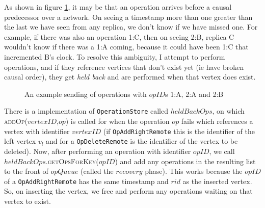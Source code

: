 \documentclass[diss.tex]{subfiles}
\begin{document}
As shown in figure \ref{fig:deliveryorder}, it may be that an operation arrives before a causal predecessor over a network. On seeing a timestamp more than one greater than the last we have seen from any replica, we don't know if we have missed one. For example, if there was also an operation 1:C, then on seeing 2:B, replica C wouldn't know if there was a 1:A coming, because it could have been 1:C that incremented B's clock. To resolve this ambiguity, I attempt to perform operations, and if they reference vertices that don't exist yet (ie have broken causal order), they get \textit{held back} and are performed when that vertex does exist.

\begin{figure}[H]
\centering
{}
\caption{An example sending of operations with $opID$s 1:A, 2:A and 2:B}
\label{fig:deliveryorder}
\end{figure}

There is a implementation of \texttt{OperationStore} called $heldBackOps$, on which \textsc{addOp}($ vertexID$,$op$) is called for when the operation $op$ fails which references a vertex with identifier $vertexID$ (if \texttt{OpAddRightRemote} this is the identifier of the left vertex $v_l$ and for a \texttt{OpDeleteRemote} is the identifier of the vertex to be deleted). Now, after performing an operation with identifier $opID$, we call $heldBackOps.$\textsc{getOpsForKey}($opID$) and add any operations in the resulting list to the front of $opQueue$ (called the $recovery$ phase). This works because the $opID$ of a \texttt{OpAddRightRemote} has the same timestamp and $rid$ as the inserted vertex. So, on inserting the vertex, we free and perform any operations waiting on that vertex to exist.
\end{document}
